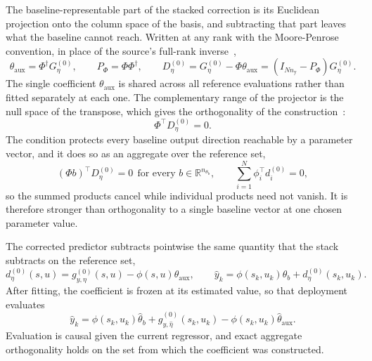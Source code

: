 \documentclass[11pt,a4paper]{article}
\newcommand{\R}{\mathbb R}
\theoremstyle{remark}
\begin{document}
The baseline-representable part of the stacked correction is its Euclidean projection onto the
column space of the basis, and subtracting that part leaves what the baseline cannot reach.
Written at any rank with the Moore-Penrose convention, in place of the source's full-rank
inverse~\cite[Eq.~(8)]{gyorok2026obc},
\begin{equation}\label{eq:originalprojection}
\theta_{\mathrm{aux}}=\Phi^\dagger G_\eta^{(0)},\qquad
P_\Phi=\Phi\Phi^\dagger,\qquad
D_\eta^{(0)}=G_\eta^{(0)}-\Phi\theta_{\mathrm{aux}}=(I_{Nn_{\mathrm y}}-P_\Phi)G_\eta^{(0)}.
\end{equation}
The single coefficient \(\theta_{\mathrm{aux}}\) is shared across all reference evaluations rather
than fitted separately at each one. The complementary range of the projector is the null space of
the transpose, which gives the orthogonality of the
construction~\cite[Lemma~3, Eq.~(11)]{gyorok2026obc}:
\begin{equation}\label{eq:originalorthogonality}
\boxed{\Phi^\top D_\eta^{(0)}=0.}
\end{equation}
The condition protects every baseline output direction reachable by a parameter vector, and it
does so as an aggregate over the reference set,
\begin{equation*}
(\Phi b)^\top D_\eta^{(0)}=0\ \ \text{for every }b\in\R^{n_{\theta_{\mathrm b}}},
\qquad\sum_{i=1}^N\phi_i^\top d_i^{(0)}=0,
\end{equation*}
so the summed products cancel while individual products need not vanish. It is therefore stronger
than orthogonality to a single baseline vector at one chosen parameter value.

The corrected predictor subtracts pointwise the same quantity that the stack subtracts on the
reference set,
\begin{equation}\label{eq:originalcorrected}
d_\eta^{(0)}(s,u)=g_{y,\eta}^{(0)}(s,u)-\phi(s,u)\theta_{\mathrm{aux}},\qquad
\hat y_k=\phi(s_k,u_k)\theta_b+d_\eta^{(0)}(s_k,u_k).
\end{equation}
After fitting, the coefficient is frozen at its estimated value, so that deployment evaluates
\begin{equation*}
\hat y_k=\phi(s_k,u_k)\hat\theta_b+g_{y,\hat\eta}^{(0)}(s_k,u_k)
-\phi(s_k,u_k)\hat\theta_{\mathrm{aux}}.
\end{equation*}
Evaluation is causal given the current regressor, and exact aggregate orthogonality holds on the
set from which the coefficient was constructed.
\end{document}
